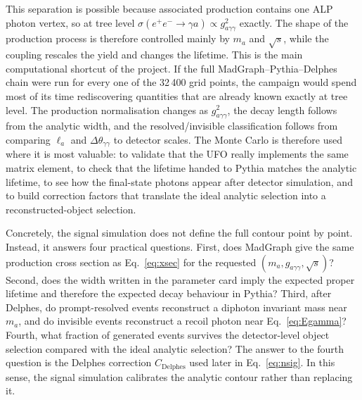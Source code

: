 \documentclass[12pt,a4paper]{article}
\newcommand{\gagg}{g_{a\gamma\gamma}}
\newcommand{\sqrts}{\sqrt{s}}
\begin{document}
This separation is possible because associated production contains one ALP
photon vertex, so at tree level
$\sigma(e^+e^-\to\gamma a)\propto\gagg^2$ exactly. The shape of the production
process is therefore controlled mainly by $m_a$ and $\sqrts$, while the coupling
rescales the yield and changes the lifetime.
This is the main computational shortcut of the project. If the full
MadGraph--Pythia--Delphes chain were run for every one of the 32\,400 grid
points, the campaign would spend most of its time rediscovering quantities that
are already known exactly at tree level. The production normalisation changes
as $\gagg^2$, the decay length follows from the analytic width, and the
resolved/invisible classification follows from comparing $\ell_a$ and
$\Delta\theta_{\gamma\gamma}$ to detector scales. The Monte Carlo is therefore
used where it is most valuable: to validate that the UFO really implements the
same matrix element, to check that the lifetime handed to Pythia matches the
analytic lifetime, to see how the final-state photons appear after detector
simulation, and to build correction factors that translate the ideal analytic
selection into a reconstructed-object selection.

Concretely, the signal simulation does not define the full contour point by
point. Instead, it answers four practical questions.
First, does MadGraph give the same production cross section as
Eq.~\eqref{eq:xsec} for the requested $(m_a,\gagg,\sqrts)$?
Second, does the width written in the parameter card imply the expected
proper lifetime and therefore the expected decay behaviour in Pythia?
Third, after Delphes, do prompt-resolved events reconstruct a diphoton
invariant mass near $m_a$, and do invisible events reconstruct a recoil photon
near Eq.~\eqref{eq:Egamma}?
Fourth, what fraction of generated events survives the detector-level object
selection compared with the ideal analytic selection?
The answer to the fourth question is the Delphes correction
$C_\mathrm{Delphes}$ used later in Eq.~\eqref{eq:nsig}. In this sense, the
signal simulation calibrates the analytic contour rather than replacing it.
\end{document}
